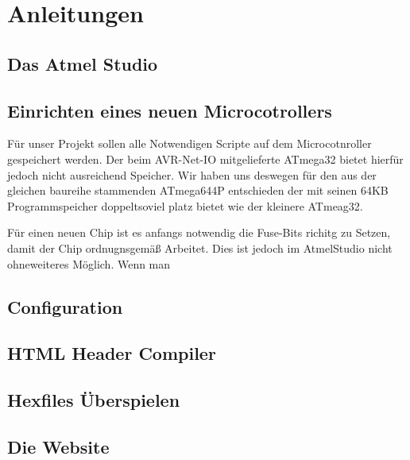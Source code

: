 \chapter{Anleitungen}

\section{Das Atmel Studio}

\section{Einrichten eines neuen Microcotrollers}
Für unser Projekt sollen alle Notwendigen Scripte auf dem Microcotnroller
gespeichert werden. Der beim AVR-Net-IO mitgelieferte ATmega32 bietet hierfür
jedoch nicht ausreichend Speicher.
Wir haben uns deswegen für den aus der gleichen baureihe stammenden ATmega644P
entschieden der mit seinen 64KB Programmspeicher doppeltsoviel platz bietet wie
der kleinere ATmeag32.

Für einen neuen Chip ist es anfangs notwendig die Fuse-Bits richitg zu Setzen,
damit der Chip ordnugnsgemäß Arbeitet.
Dies ist jedoch im AtmelStudio nicht ohneweiteres Möglich.
Wenn man

\section{Configuration}

\section{HTML Header Compiler}

\section{Hexfiles Überspielen}

\section{Die Website}
